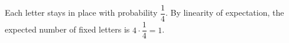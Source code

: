 Each letter stays in place with probability $\dfrac14$. By linearity of expectation, the expected number of fixed letters is $4\cdot\dfrac14=\boxed{1}$.
